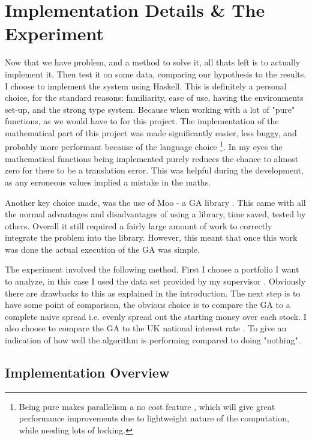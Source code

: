 \documentclass[11pt]{article}
\begin{document}
\section{Implementation Details \& The Experiment}

    Now that we have problem, and a method to solve it, all thats left is to actually
    implement it. Then test it on some data, comparing our hypothesis to the results.
    I choose to implement the system using Haskell. This is definitely a personal
    choice, for the standard reasons: familiarity, ease of use, having the environments
    set-up, and the strong type system. Because when working with a lot of "pure"
    functions, as we would have to for this project. The implementation 
    of the mathematical part of this project was made significantly
    easier, less buggy, and probably more performant because of the language choice
    \footnote{Being pure makes parallelism a no cost feature \cite{HarrisMarlowJones, Chakravarty}, 
    which will give great performance improvements due to lightweight nature of the 
    computation, while needing lots of locking. }.
    In my eyes the mathematical functions
    being implemented purely reduces the chance to almost zero for there to be a translation
    error. This was helpful during the development, as any erroneous values implied a mistake
    in the maths.

    Another key choice made, was the use of Moo - a GA library \cite{Moo}. This came with all
    the normal advantages and disadvantages of using a library, time saved, tested by others.
    Overall it still required a fairly large amount of work to correctly integrate the
    problem into the library. However, this meant that once this work was done the actual
    execution of the GA was simple.

    The experiment involved the following method. First I choose a portfolio I want to
    analyze, in this case I used the data set provided by my supervisor \cite{Dataset}.
    Obviously there are drawbacks to this as explained in the introduction. The next step is
    to have some point of comparison, the obvious choice is to compare the GA to
    a complete naive spread i.e. evenly spread out the starting money over each stock.
    I also choose to compare the GA to the UK national interest rate \cite{BankOfE} . To give an
    indication of how well the algorithm is performing compared to doing "nothing".

\subsection{Implementation Overview}
\end{document}
